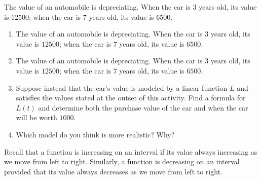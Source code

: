 \documentclass[nooutcomes]{ximera}
\begin{document}
\begin{example}
\begin{explanation}
\end{explanation}
\end{example}

\begin{exploration}
The value of an automobile is depreciating.  When the car is $3$ years old, its value is \textdollar{}$12500$; when the car is $7$ years old, its value is \textdollar{}$6500$.

\begin{enumerate}[label=\alph*.]
\item The value of an automobile is depreciating.  When the car is $3$ years old, its value is \textdollar{}$12500$; when the car is $7$ years old, its value is \textdollar{}$6500$.
\item The value of an automobile is depreciating.  When the car is $3$ years old, its value is \textdollar{}$12500$; when the car is $7$ years old, its value is \textdollar{}$6500$.
\item Suppose instead that the car's value is modeled by a linear function $L$ and satisfies the values stated at the outset of this activity.  Find a formula for $L(t)$ and determine both the purchase value of the car and when the car will be worth \textdollar{}$1000$.
\item Which model do you think is more realistic?  Why?
\end{enumerate}
\end{exploration}


Recall that a function is increasing on an interval if its value always increasing as we move from left to right.  Similarly, a function is decreasing on an interval provided that its value always decreases as we move from left to right.
\end{document}
